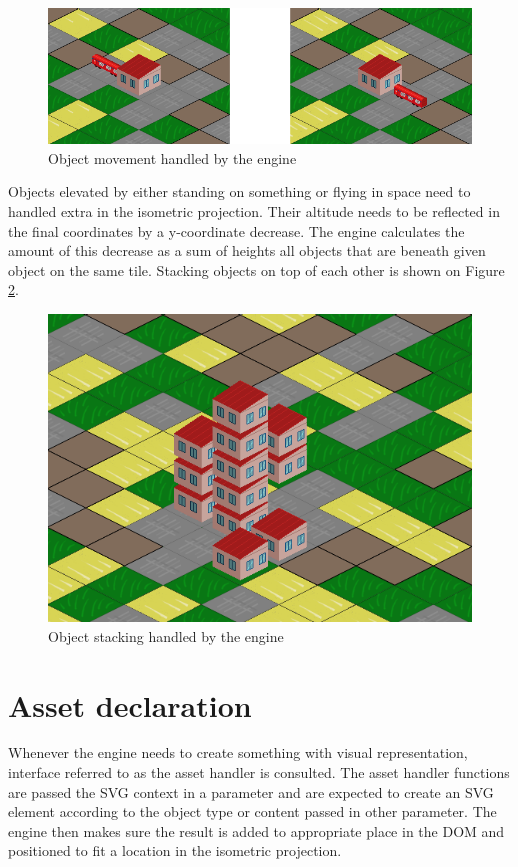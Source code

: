 \documentclass[11pt,oneside, final]{fithesis2}
\begin{document}
\begin{figure}[h]
	\centering
	\includegraphics[width=\textwidth]{thesis-movement}
	\caption{Object movement handled by the engine}
	\label{movement}
\end{figure}

Objects elevated by either standing on something or flying in space need to handled extra in the isometric projection. Their altitude needs to be reflected in the final coordinates by a y-coordinate decrease. The engine calculates the amount of this decrease as a sum of heights all objects that are beneath given object on the same tile. Stacking objects on top of each other is shown on Figure \ref{stacking}.

\begin{figure}[h]
	\centering
	\includegraphics[width=\textwidth]{thesis-stacking}
	\caption{Object stacking handled by the engine}
	\label{stacking}
\end{figure}

\section{Asset declaration}
Whenever the engine needs to create something with visual representation, interface referred to as the asset handler is consulted. The asset handler functions are passed the SVG context in a parameter and are expected to create an SVG element according to the object type or content passed in other parameter. The engine then makes sure the result is added to appropriate place in the DOM and positioned to fit a location in the isometric projection.
\end{document}
